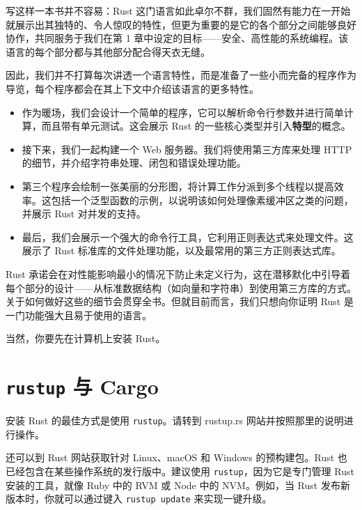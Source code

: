 
写这样一本书并不容易：Rust 这门语言如此卓尔不群，我们固然有能力在一开始就展示出其独特的、令人惊叹的特性，但更为重要的是它的各个部分之间能够良好协作，共同服务于我们在第 1 章中设定的目标——安全、高性能的系统编程。该语言的每个部分都与其他部分配合得天衣无缝。

因此，我们并不打算每次讲透一个语言特性，而是准备了一些小而完备的程序作为导览，每个程序都会在其上下文中介绍该语言的更多特性。

\begin{itemize}
\item 作为暖场，我们会设计一个简单的程序，它可以解析命令行参数并进行简单计算，而且带有单元测试。这会展示 Rust 的一些核心类型并引入\textbf{特型}的概念。
\item 接下来，我们一起构建一个 Web 服务器。我们将使用第三方库来处理 HTTP 的细节，并介绍字符串处理、闭包和错误处理功能。
\item 第三个程序会绘制一张美丽的分形图，将计算工作分派到多个线程以提高效率。这包括一个泛型函数的示例，以说明该如何处理像素缓冲区之类的问题，并展示 Rust 对并发的支持。
\item 最后，我们会展示一个强大的命令行工具，它利用正则表达式来处理文件。这展示了 Rust 标准库的文件处理功能，以及最常用的第三方正则表达式库。
\end{itemize}

Rust 承诺会在对性能影响最小的情况下防止未定义行为，这在潜移默化中引导着每个部分的设计——从标准数据结构（如向量和字符串）到使用第三方库的方式。关于如何做好这些的细节会贯穿全书。但就目前而言，我们只想向你证明 Rust 是一门功能强大且易于使用的语言。

当然，你要先在计算机上安装 Rust。

\section{\texttt{rustup} 与 Cargo}

安装 Rust 的最佳方式是使用 \texttt{rustup}。请转到 rustup.rs 网站并按照那里的说明进行操作。

还可以到 Rust 网站获取针对 Linux、macOS 和 Windows 的预构建包。Rust 也已经包含在某些操作系统的发行版中。建议使用 \texttt{rustup}，因为它是专门管理 Rust 安装的工具，就像 Ruby 中的 RVM 或 Node 中的 NVM。例如，当 Rust 发布新版本时，你就可以通过键入 \texttt{rustup update} 来实现一键升级。

